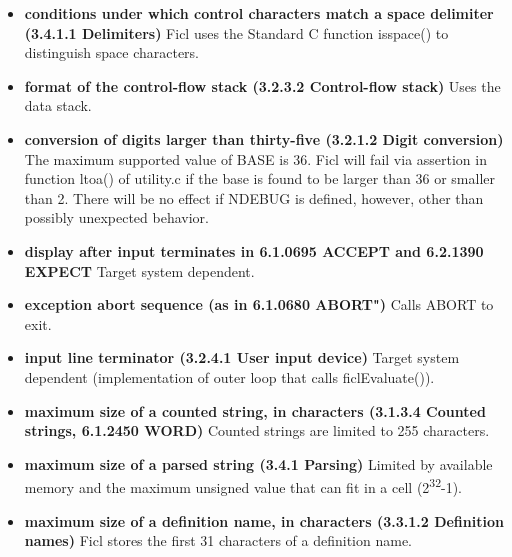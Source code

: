 \begin{itemize}[noitemsep]
	\item \textbf{conditions under which control characters match a
		space delimiter (3.4.1.1 Delimiters)}\newline
	Ficl uses the Standard C function isspace() to distinguish
	space characters.

	\item \textbf{format of the control-flow stack (3.2.3.2
		Control-flow stack)}\newline
	Uses the data stack.

	\item \textbf{conversion of digits larger than thirty-five
		(3.2.1.2 Digit conversion)}\newline
	The maximum supported value of BASE is 36. Ficl will fail via
	assertion in function ltoa() of utility.c if the base is found
	to be larger than 36 or smaller than 2. There will be no effect
	if NDEBUG is defined, however, other than possibly unexpected
	behavior.

	\item \textbf{display after input terminates in 6.1.0695 ACCEPT
		and 6.2.1390 EXPECT}\newline
	Target system dependent.

	\item \textbf{exception abort sequence (as in 6.1.0680
		ABORT")}\newline
	Calls ABORT to exit.

	\item \textbf{input line terminator (3.2.4.1 User input
		device)}\newline
	Target system dependent (implementation of outer loop that
	calls ficlEvaluate()).

	\item \textbf{maximum size of a counted string, in characters
		(3.1.3.4 Counted strings, 6.1.2450 WORD)}\newline
	Counted strings are limited to 255 characters.

	\item \textbf{maximum size of a parsed string (3.4.1
		Parsing)}\newline
	Limited by available memory and the maximum unsigned value that
	can fit in a cell (2\textsuperscript{32}-1).

	\item \textbf{maximum size of a definition name, in characters
		(3.3.1.2 Definition names)}\newline
	Ficl stores the first 31 characters of a definition name.


\end{itemize}

